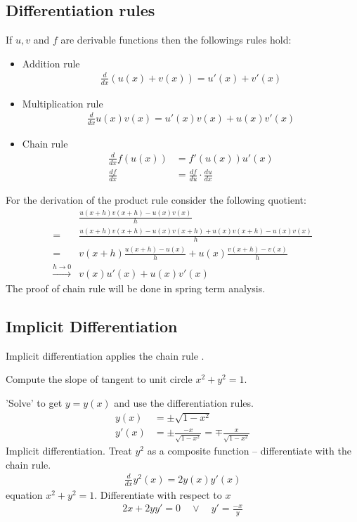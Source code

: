 \subsection{Differentiation rules}
If $u,v$ and $f$ are derivable functions then the followings rules hold: 
\begin{itemize}
\item 
Addition rule
\begin{align*}
\frac d {dx} (u(x) + v(x) )= u'(x) + v'(x) 
\end{align*}
\item 
Multiplication rule
\begin{align*}
\frac d {dx} u(x) v(x) = u'(x) v(x)+u(x) v'(x) 
\end{align*}
\item 
Chain rule
\begin{align*}
\frac d {dx} f(u(x)) & = f'(u(x)) u'(x) \\
\frac{df}{dx} & = \frac{df}{du} \cdot \frac {du}{dx} 
\end{align*}
\end{itemize}
For the derivation of the product rule consider the following quotient:  
\begin{align*}
& \frac{u(x+h)v(x+h) -u(x)v(x)} h \\
= & \frac{u(x+h)v(x+h) - u(x)v(x+h) + u(x) v(x+h) - u(x)v(x)} h \\
= & v(x+h) \frac{u(x+h)-u(x)}{h} + u(x) \frac{v(x+h)-v(x)} h \\
\overset{h \to 0} \to & v(x)u'(x) +u(x)v'(x)
\end{align*}
The proof of chain rule will be done in spring term analysis.

\subsection{Implicit Differentiation}
\begin{rk}
Implicit differentiation applies the chain rule .
\end{rk}
\begin{ex}
Compute the slope of tangent to unit circle $x^2+y^2=1$.
\end{ex}
'Solve' to get $y=y(x)$ and use the differentiation rules.
\begin{align*}
y(x) & = \pm \sqrt{1-x^2} \\
y'(x)& = \pm \frac{-x}{\sqrt{1-x^2}} = \mp \frac x {\sqrt{1-x^2}}
\end{align*}
Implicit differentiation. Treat $y^2$ as a composite function -- differentiate with the chain rule.
\begin{align*}
\frac{d}{dx} y^2(x) = 2 y(x)y'(x)
\end{align*}
equation $x^2+y^2=1$. Differentiate with respect to $x$
\begin{align*}
2x + 2 y y' = 0 \quad \vee \quad y'=\frac{-x} y
\end{align*}


